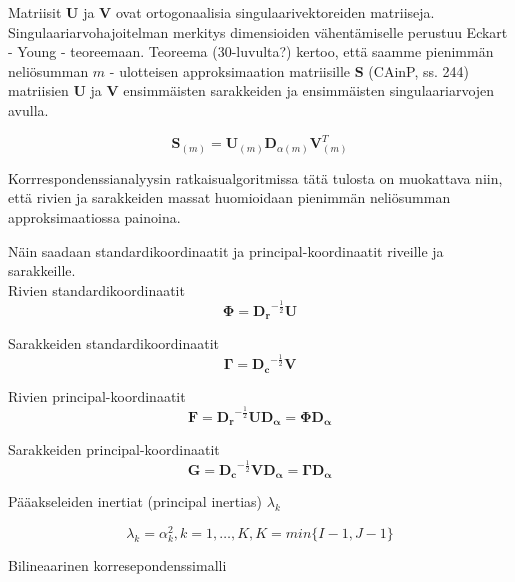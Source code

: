 \documentclass[12pt,a4paper,leqno]{article}
\theoremstyle{plain}
\theoremstyle{definition}
\theoremstyle{remark}
\begin{document}
Matriisit $\boldsymbol{U}$ ja $\boldsymbol{V}$ ovat ortogonaalisia singulaarivektoreiden matriiseja. Singulaariarvohajoitelman merkitys dimensioiden vähentämiselle perustuu Eckart - Young - teoreemaan. Teoreema (30-luvulta?) kertoo, että saamme pienimmän neliösumman $m$ - ulotteisen approksimaation matriisille $\boldsymbol{S}$ (CAinP, ss. 244) matriisien 
$\boldsymbol{U}$ ja $\boldsymbol{V}$ ensimmäisten sarakkeiden ja ensimmäisten singulaariarvojen avulla.

\[
\boldsymbol{S}_{(m)} = \boldsymbol{U}_{(m)} \boldsymbol{D}_{\alpha(m)} \boldsymbol{V}_{(m)}^{T}
\] 

Korrrespondenssianalyysin ratkaisualgoritmissa tätä tulosta on muokattava niin, että rivien ja sarakkeiden massat huomioidaan pienimmän neliösumman approksimaatiossa painoina.

Näin saadaan standardikoordinaatit ja principal-koordinaatit riveille ja sarakkeille.\\

Rivien standardikoordinaatit
\begin{equation}
\boldsymbol{\Phi} = \boldsymbol{D_r}^{-\frac{1}{2}} \boldsymbol{U} \label{B} 
\end{equation}

Sarakkeiden standardikoordinaatit
\begin{equation}
 \boldsymbol{\Gamma} = \boldsymbol{D_c}^{-\frac{1}{2}} \boldsymbol{V} \label{C}
\end{equation}

Rivien principal-koordinaatit
\begin{equation}
 \boldsymbol{F} =   \boldsymbol{D_r}^{-\frac{1}{2}} \boldsymbol{U}  \boldsymbol{D_{\alpha}} = \boldsymbol{\Phi} \boldsymbol{D_{\alpha}} \label{D}
\end{equation}

Sarakkeiden principal-koordinaatit
\begin{equation}
 \boldsymbol{G}  = \boldsymbol{D_c}^{-\frac{1}{2}} \boldsymbol{V} \boldsymbol{D_{\alpha}} = \boldsymbol{\Gamma}  \boldsymbol{D_{\alpha}} \label{E}
\end{equation}

Pääakseleiden inertiat (principal inertias) $\lambda_{k}$

\begin{equation}
\lambda_{k} = \alpha_{k}^2, k = 1,\dots,K,
K = min \{ I-1, J-1 \}
\end{equation}

Bilineaarinen korresepondenssimalli 
\end{document}
